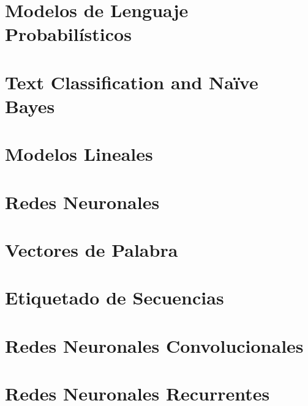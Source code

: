\documentclass{book}
\begin{document}
\chapter{Modelos de Lenguaje Probabilísticos}
\label{cap_plm}



\chapter{Text Classification and Naïve Bayes}
\label{cap_nb}



\chapter{Modelos Lineales}
\label{cap_lineales}



\chapter{Redes Neuronales}
\label{cap_redes}


\chapter{Vectores de Palabra}
\label{cap_embeddings}


\chapter{Etiquetado de Secuencias}
\label{cap_etisec}




\chapter{Redes Neuronales Convolucionales}
\label{cap_cnn}








\chapter{Redes Neuronales Recurrentes}
\label{cap_rnn}

\end{document}
